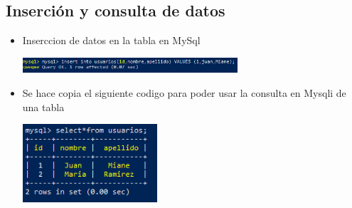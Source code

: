 \documentclass[%
 reprint,
 amsmath,amssymb,
 aps,
]{revtex4-1}
\begin{document}
\subsection{Inserción y consulta de datos}
                     \begin{itemize}
		\item Inserccion de datos en la tabla  en MySql
                      \begin{center}
		\includegraphics[width=8cm]{./Imagenes/26}
		\end{center}	
		\item Se hace copia el siguiente codigo para poder usar la consulta en Mysqli de una tabla 
                     \begin{center}
		\includegraphics[width=5cm]{./Imagenes/27}
		\end{center}	
                  
	          \end{itemize}
\end{document}
